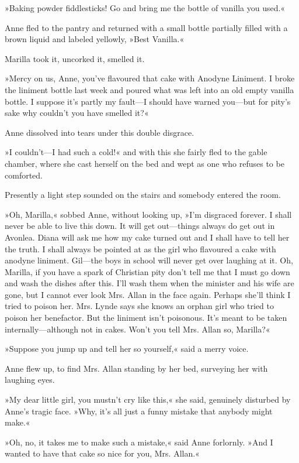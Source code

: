 »Baking powder fiddlesticks! Go and bring me the bottle of vanilla you used.«

Anne fled to the pantry and returned with a small bottle partially filled with a brown liquid and labeled yellowly, »Best Vanilla.«

Marilla took it, uncorked it, smelled it.

»Mercy on us, Anne, you’ve flavoured that cake with Anodyne Liniment. I broke the liniment bottle last week and poured what was left into an old empty vanilla bottle. I suppose it’s partly my fault—I should have warned you—but for pity’s sake why couldn’t you have smelled it?«

Anne dissolved into tears under this double disgrace.

»I couldn’t—I had such a cold!« and with this she fairly fled to the gable chamber, where she cast herself on the bed and wept as one who refuses to be comforted.

Presently a light step sounded on the stairs and somebody entered the room.

»Oh, Marilla,« sobbed Anne, without looking up, »I’m disgraced forever. I shall never be able to live this down. It will get out—things always do get out in Avonlea. Diana will ask me how my cake turned out and I shall have to tell her the truth. I shall always be pointed at as the girl who flavoured a cake with anodyne liniment. Gil—the boys in school will never get over laughing at it. Oh, Marilla, if you have a spark of Christian pity don’t tell me that I must go down and wash the dishes after this. I’ll wash them when the minister and his wife are gone, but I cannot ever look Mrs. Allan in the face again. Perhaps she’ll think I tried to poison her. Mrs. Lynde says she knows an orphan girl who tried to poison her benefactor. But the liniment isn’t poisonous. It’s meant to be taken internally—although not in cakes. Won’t you tell Mrs. Allan so, Marilla?«

»Suppose you jump up and tell her so yourself,« said a merry voice.

Anne flew up, to find Mrs. Allan standing by her bed, surveying her with laughing eyes.

»My dear little girl, you mustn’t cry like this,« she said, genuinely disturbed by Anne’s tragic face. »Why, it’s all just a funny mistake that anybody might make.«

»Oh, no, it takes me to make such a mistake,« said Anne forlornly. »And I wanted to have that cake so nice for you, Mrs. Allan.«

